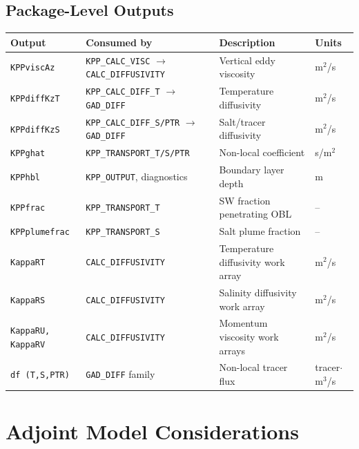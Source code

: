 \documentclass[12pt,letterpaper]{article}
\begin{document}
\subsection{Package-Level Outputs}  
  
\begin{longtable}{p{3.5cm} p{3cm} p{4.5cm} l}  
\toprule  
\textbf{Output} & \textbf{Consumed by} & \textbf{Description} & \textbf{Units} \\  
\midrule  
\endhead  
\texttt{KPPviscAz} & \texttt{KPP\_CALC\_VISC} $\to$ \texttt{CALC\_DIFFUSIVITY} &  
  Vertical eddy viscosity & m$^2$/s \\  
\texttt{KPPdiffKzT} & \texttt{KPP\_CALC\_DIFF\_T} $\to$ \texttt{GAD\_DIFF} &  
  Temperature diffusivity & m$^2$/s \\  
\texttt{KPPdiffKzS} & \texttt{KPP\_CALC\_DIFF\_S/PTR} $\to$ \texttt{GAD\_DIFF} &  
  Salt/tracer diffusivity & m$^2$/s \\  
\texttt{KPPghat} & \texttt{KPP\_TRANSPORT\_T/S/PTR} &  
  Non-local coefficient & s/m$^2$ \\  
\texttt{KPPhbl} & \texttt{KPP\_OUTPUT}, diagnostics &  
  Boundary layer depth & m \\  
\texttt{KPPfrac} & \texttt{KPP\_TRANSPORT\_T} &  
  SW fraction penetrating OBL & -- \\  
\texttt{KPPplumefrac} & \texttt{KPP\_TRANSPORT\_S} &  
  Salt plume fraction & -- \\  
\texttt{KappaRT} & \texttt{CALC\_DIFFUSIVITY} &  
  Temperature diffusivity work array & m$^2$/s \\  
\texttt{KappaRS} & \texttt{CALC\_DIFFUSIVITY} &  
  Salinity diffusivity work array & m$^2$/s \\  
\texttt{KappaRU, KappaRV} & \texttt{CALC\_DIFFUSIVITY} &  
  Momentum viscosity work arrays & m$^2$/s \\  
\texttt{df (T,S,PTR)} & \texttt{GAD\_DIFF} family &  
  Non-local tracer flux & tracer$\cdot$m$^3$/s \\  
\bottomrule  
\end{longtable}  
  
  

\section{Adjoint Model Considerations}
\label{app:adjoint_considerations}
\end{document}
